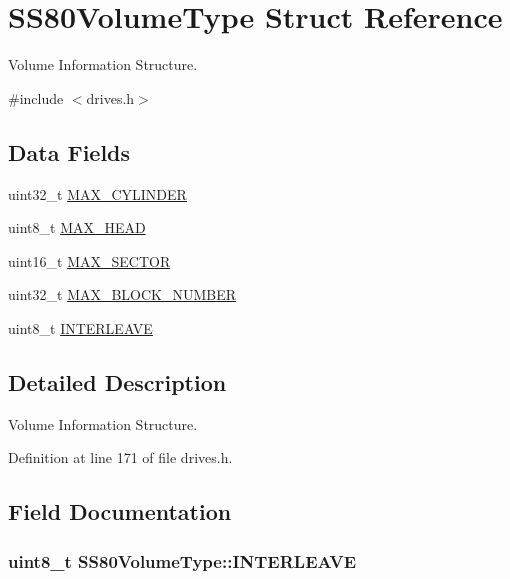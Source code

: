 \hypertarget{structSS80VolumeType}{}\section{S\+S80\+Volume\+Type Struct Reference}
\label{structSS80VolumeType}


Volume Information Structure.  




{\ttfamily \#include $<$drives.\+h$>$}

\subsection*{Data Fields}
\begin{DoxyCompactItemize}
\item 
uint32\+\_\+t \hyperlink{structSS80VolumeType_a53b65739246cea4e0d9095c88b03be8e}{M\+A\+X\+\_\+\+C\+Y\+L\+I\+N\+D\+ER}
\item 
uint8\+\_\+t \hyperlink{structSS80VolumeType_acc2870eb0a52a0e7f4dc57f036d903b1}{M\+A\+X\+\_\+\+H\+E\+AD}
\item 
uint16\+\_\+t \hyperlink{structSS80VolumeType_a0a367b3bf05801cdee9dadc8324a3bdb}{M\+A\+X\+\_\+\+S\+E\+C\+T\+OR}
\item 
uint32\+\_\+t \hyperlink{structSS80VolumeType_afe3db69c9ec54fa6d9fd48f3e6e9097b}{M\+A\+X\+\_\+\+B\+L\+O\+C\+K\+\_\+\+N\+U\+M\+B\+ER}
\item 
uint8\+\_\+t \hyperlink{structSS80VolumeType_accc9f011ff8edebcc6d781d1aa51f16d}{I\+N\+T\+E\+R\+L\+E\+A\+VE}
\end{DoxyCompactItemize}


\subsection{Detailed Description}
Volume Information Structure. 

Definition at line 171 of file drives.\+h.



\subsection{Field Documentation}
\subsubsection[{\texorpdfstring{I\+N\+T\+E\+R\+L\+E\+A\+VE}{INTERLEAVE}}]{\setlength{\rightskip}{0pt plus 5cm}uint8\+\_\+t S\+S80\+Volume\+Type\+::\+I\+N\+T\+E\+R\+L\+E\+A\+VE}\hypertarget{structSS80VolumeType_accc9f011ff8edebcc6d781d1aa51f16d}{}\label{structSS80VolumeType_accc9f011ff8edebcc6d781d1aa51f16d}



